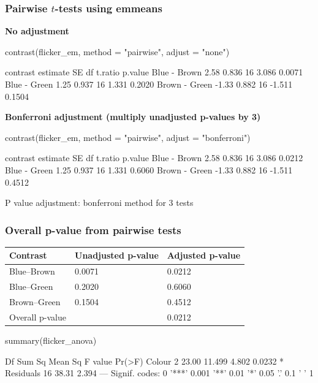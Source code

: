 \documentclass[a4paper]{article}\usepackage[]{graphicx}\usepackage[]{xcolor}
\begin{document}
\subsubsection{Pairwise \( t \)-tests using emmeans}
\textbf{No adjustment}
\begin{Schunk}
\begin{Sinput}
contrast(flicker_em, method = "pairwise", adjust = "none")
\end{Sinput}
\begin{Soutput}
 contrast      estimate    SE df t.ratio p.value
 Blue - Brown      2.58 0.836 16   3.086  0.0071
 Blue - Green      1.25 0.937 16   1.331  0.2020
 Brown - Green    -1.33 0.882 16  -1.511  0.1504
\end{Soutput}
\end{Schunk}
\textbf{Bonferroni adjustment (multiply unadjusted p-values by 3)}
\begin{Schunk}
\begin{Sinput}
contrast(flicker_em, method = "pairwise", adjust = "bonferroni")
\end{Sinput}
\begin{Soutput}
 contrast      estimate    SE df t.ratio p.value
 Blue - Brown      2.58 0.836 16   3.086  0.0212
 Blue - Green      1.25 0.937 16   1.331  0.6060
 Brown - Green    -1.33 0.882 16  -1.511  0.4512

P value adjustment: bonferroni method for 3 tests 
\end{Soutput}
\end{Schunk}
\subsubsection{Overall p-value from pairwise tests}
\begin{table}[H]
	\begin{tabular}{@{}lll@{}}
	\toprule
	\textbf{Contrast} & \textbf{Unadjusted p-value} & \textbf{Adjusted p-value} \\ \midrule
	Blue--Brown        & 0.0071                      & 0.0212                   \\
	Blue--Green        & 0.2020                      & 0.6060                   \\
	Brown--Green       & 0.1504                      & 0.4512                   \\ \midrule
	Overall p-value   &                             & 0.0212                    \\ \bottomrule
	\end{tabular}
\end{table}
\begin{Schunk}
\begin{Sinput}
summary(flicker_anova)
\end{Sinput}
\begin{Soutput}
            Df Sum Sq Mean Sq F value Pr(>F)  
Colour       2  23.00  11.499   4.802 0.0232 *
Residuals   16  38.31   2.394                 
---
Signif. codes:  0 '***' 0.001 '**' 0.01 '*' 0.05 '.' 0.1 ' ' 1
\end{Soutput}
\end{Schunk}
\end{document}
